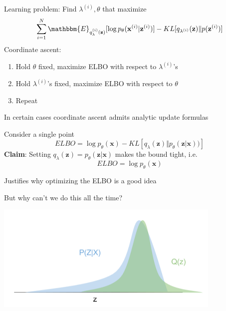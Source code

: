 \documentclass{beamer}
\let\tempone\itemize
\let\temptwo\enditemize
\renewenvironment{itemize}{\tempone\addtolength{\itemsep}{0.5\baselineskip}}{\temptwo}
\newcommand{\zvec}{\mathbf{z}}
\newcommand{\E}{\mathbbm{E}}
\newcommand{\xvec}{\mathbf{x}}
\begin{document}
\begin{frame}
  \begin{center}
   \end{center}   
   Learning problem: Find $\lambda^{(i)}, \theta$ that maximize 
\[ \sum_{i=1}^N \E_{q_\lambda^{(i)}(\zvec)}[\log  p_\theta(\xvec^{(i)} | \zvec^{(i)}) ] - KL[q_{\lambda^{(i)}}(\zvec) \Vert p(\zvec^{(i)})] \]
Coordinate ascent:
\begin{enumerate}
\item Hold $\theta$ fixed, maximize ELBO with respect to $\lambda^{(i)}$'s
\item Hold $\lambda^{(i)}$'s fixed, maximize ELBO with respect to $\theta$
\item Repeat
\end{enumerate}
In certain cases coordinate ascent admits analytic update formulas
\end{frame}

\begin{frame}
  \begin{center}
   \end{center}   
       Consider a single point
  \[ ELBO = \log p_\theta(\xvec)- KL[ q_\lambda(\zvec) \Vert p_\theta(\zvec | \xvec)) ]  \]
   \textbf{Claim}: Setting $q_\lambda(\zvec) = p_\theta(\zvec | \xvec)$ makes the bound tight, i.e.
     \[ ELBO = \log p_\theta(\xvec)  \]
     \begin{itemize}
  \item Justifies why optimizing the ELBO is a good idea
  \item But why can't we do this all the time?
  \end{itemize}
  \end{frame}
  
  \begin{frame}
  \begin{center}
   \end{center}   
   \center
\includegraphics[scale=0.7]{vi-gauss}
 \end{frame}
\end{document}
